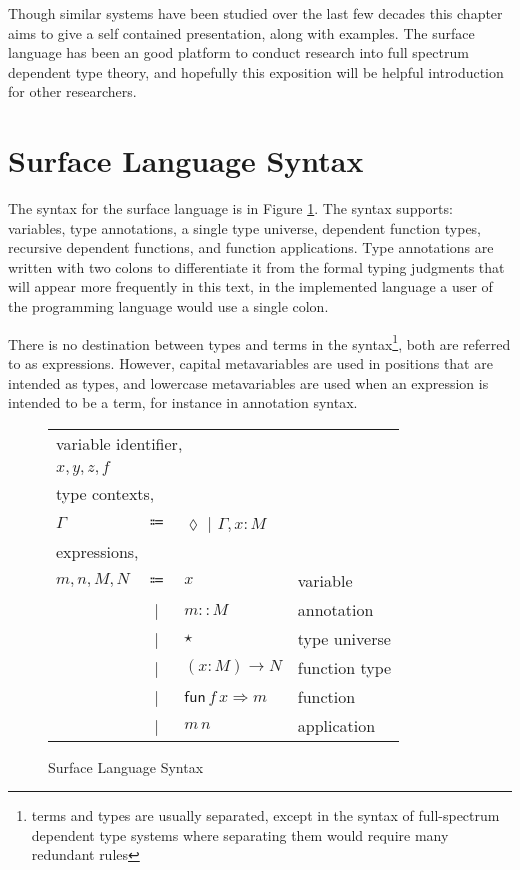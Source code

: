 Though similar systems have been studied over the last few decades
this chapter aims to give a self contained presentation, along with
examples. The surface language has been an good platform to conduct
research into full spectrum dependent type theory, and hopefully this
exposition will be helpful introduction for other researchers.

\section{Surface Language Syntax}


The syntax for the surface language is in Figure \ref{fig:surface-pre-syntax}.
The syntax supports: variables, type annotations, a single type universe,
dependent function types, recursive dependent functions, and function
applications. Type annotations are written with two colons to differentiate
it from the formal typing judgments that will appear more frequently
in this text, in the implemented language a user of the programming
language would use a single colon. 

There is no destination between types and terms in the syntax\footnote{terms and types are usually separated, except in the syntax of full-spectrum
dependent type systems where separating them would require many redundant
rules}, both are referred to as expressions. However, capital metavariables
are used in positions that are intended as types, and lowercase metavariables
are used when an expression is intended to be a term, for instance
in annotation syntax. 





\begin{figure}
\begin{tabular}{lcll}
\multicolumn{4}{l}{variable identifier,}\tabularnewline
\multicolumn{4}{l}{$x,y,z,f$}\tabularnewline
\multicolumn{4}{l}{type contexts,}\tabularnewline
$\Gamma$ & $\Coloneqq$ & $\lozenge$ | $\Gamma,x:M$ & \tabularnewline
\multicolumn{4}{l}{expressions,}\tabularnewline
$m,n,M,N$ & $\Coloneqq$ & $x$ & variable\tabularnewline
 & | & $m::M$ & annotation\tabularnewline
 & | & $\star$ & type universe\tabularnewline
 & | & $\left(x:M\right)\rightarrow N$ & function type\tabularnewline
 & | & $\mathsf{fun}\,f\,x\Rightarrow m$ & function\tabularnewline
 & | & $m\,n$ & application\tabularnewline
\end{tabular}\caption{Surface Language Syntax}
\label{fig:surface-pre-syntax}
\end{figure}


